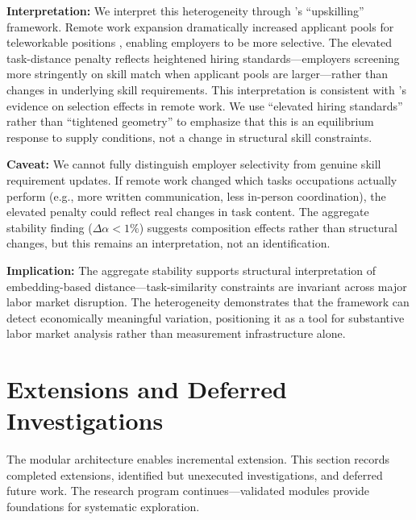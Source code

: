 \documentclass[12pt]{article}
\begin{document}
\textbf{Interpretation:} We interpret this heterogeneity through \citet{ModestinoShoagBallance2020}'s ``upskilling'' framework. Remote work expansion dramatically increased applicant pools for teleworkable positions \citep{HsuTambe2022}, enabling employers to be more selective. The elevated task-distance penalty reflects heightened hiring standards---employers screening more stringently on skill match when applicant pools are larger---rather than changes in underlying skill requirements. This interpretation is consistent with \citet{EmanuelHarrington2024}'s evidence on selection effects in remote work. We use ``elevated hiring standards'' rather than ``tightened geometry'' to emphasize that this is an equilibrium response to supply conditions, not a change in structural skill constraints.

\textbf{Caveat:} We cannot fully distinguish employer selectivity from genuine skill requirement updates. If remote work changed which tasks occupations actually perform (e.g., more written communication, less in-person coordination), the elevated penalty could reflect real changes in task content. The aggregate stability finding ($\Delta\alpha < 1\%$) suggests composition effects rather than structural changes, but this remains an interpretation, not an identification.

\textbf{Implication:} The aggregate stability supports structural interpretation of embedding-based distance---task-similarity constraints are invariant across major labor market disruption. The heterogeneity demonstrates that the framework can detect economically meaningful variation, positioning it as a tool for substantive labor market analysis rather than measurement infrastructure alone.



\section{Extensions and Deferred Investigations}
\label{sec:extensions}


The modular architecture enables incremental extension. This section records completed extensions, identified but unexecuted investigations, and deferred future work. The research program continues---validated modules provide foundations for systematic exploration.
\end{document}
